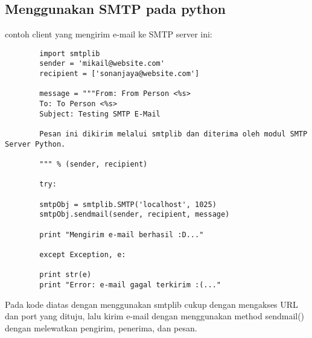 \subsection {Menggunakan SMTP pada python}
	contoh client yang mengirim e-mail ke SMTP server ini:
	\begin {verbatim}
		import smtplib
		sender = 'mikail@website.com'
		recipient = ['sonanjaya@website.com']

		message = """From: From Person <%
		To: To Person <%
		Subject: Testing SMTP E-Mail

		Pesan ini dikirim melalui smtplib dan diterima oleh modul SMTP Server Python.

		""" %

		try:

   		smtpObj = smtplib.SMTP('localhost', 1025)
   		smtpObj.sendmail(sender, recipient, message)    

   		print "Mengirim e-mail berhasil :D..."

		except Exception, e:

		print str(e)
   		print "Error: e-mail gagal terkirim :(..."
	\end{verbatim}

Pada kode diatas dengan menggunakan smtplib cukup dengan mengakses URL dan port yang dituju, lalu kirim e-mail dengan menggunakan method sendmail() dengan melewatkan pengirim, penerima, dan pesan.
